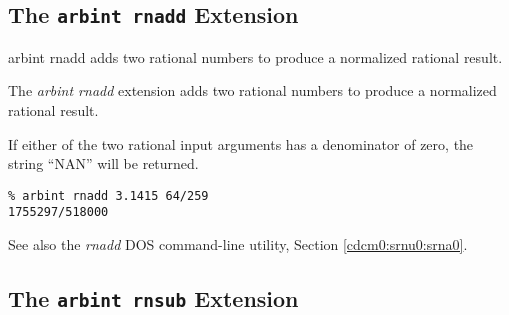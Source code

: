 \subsection{The \texttt{arbint rnadd} Extension}
\label{cxtn0:srne0:srad0}

\begin{tclcommandname}{arbint rnadd}%
adds two rational numbers to produce a normalized rational result.
\end{tclcommandname}

\begin{tclcommandsynopsis}
\end{tclcommandsynopsis}

\begin{tclcommanddescription}
The \emph{arbint rnadd} extension adds two rational numbers to produce a 
normalized rational result.

If either of the two rational input arguments has a denominator of zero,
the string ``NAN'' will be returned.
\end{tclcommanddescription}

\begin{tclcommandsampleinvocations}
\begin{scriptsize}
\begin{verbatim}
% arbint rnadd 3.1415 64/259
1755297/518000
\end{verbatim}
\end{scriptsize}
\end{tclcommandsampleinvocations}

\begin{tclcommandseealso}
See also the \emph{rnadd} DOS command-line utility, 
Section \cdcmzeroxrefhyphen{}\ref{cdcm0:srnu0:srna0}.
\end{tclcommandseealso}


\subsection{The \texttt{arbint rnsub} Extension}
\label{cxtn0:srne0:srsb0}

